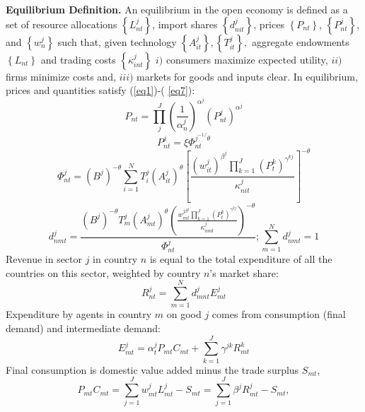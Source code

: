 \documentclass[12pt]{article}
\begin{document}
\textbf{Equilibrium Definition. } An equilibrium in the open economy is
defined as a set of resource allocations $\left\{ L_{nt}^{j}\right\} $,
import shares $\left\{ d_{nit}^{j}\right\} $, prices $\left\{ P_{nt}\right\} 
$, $\left\{ P_{nt}^{j}\right\} $, and $\left\{ w_{n}^{j}\right\} $ such
that, given technology $\left\{ A_{it}^{j}\right\} ,\left\{
T_{it}^{j}\right\} ,$ aggregate endowments $\left\{ L_{nt}\right\} $ and
trading costs $\left\{ \kappa _{int}^{j}\right\} $ $i)$ consumers maximize
expected utility, $ii)$ firms minimize costs and, $iii)$ markets for goods
and inputs clear. In equilibrium, prices and quantities satisfy (\ref{eq1})-(%
\ref{eq7}): 
\begin{equation}
P_{nt}=\prod_{j}^{J}\left( \frac{1}{\alpha _{n}^{j}}\right) ^{\alpha
^{j}}\left( P_{nt}^{j}\right) ^{\alpha ^{j}}  \label{eq1}
\end{equation}%
\begin{equation}
P_{nt}^{j}=\xi \Phi _{nt}^{j^{-1/}\theta }  \label{eq2}
\end{equation}%
\begin{equation}
\Phi _{nt}^{j}=\left( B^{j}\right) ^{-\theta }\sum_{i=1}^{N}T_{i}^{j}\left(
A_{it}^{j}\right) ^{\theta }\left[ \frac{\left( w_{it}^{j}\right) ^{\beta
^{j}}\prod_{k=1}^{J}(P_{t}^{k})^{\gamma ^{kj}}}{\kappa _{nit}^{j}}\right]
^{-\theta }  \label{eq3}
\end{equation}%
\begin{equation}
d_{nmt}^{j}=\frac{\left( B^{j}\right) ^{-\theta }T_{m}^{j}\left(
A_{mt}^{j}\right) ^{\theta }\left( \frac{w_{mt}^{j\beta
^{j}}\prod_{k=1}^{J}(P_{t}^{k})^{\gamma ^{kj}}}{\kappa _{nmt}^{j}}\right)
^{-\theta }}{\Phi _{nt}^{j}};\sum\limits_{m=1}^{N}d_{nmt}^{j}=1  \label{eq4}
\end{equation}%
Revenue in sector $j$ in country $n$ is equal to the total expenditure of
all the countries on this sector, weighted by country $n$'s market share: 
\begin{equation*}
R_{nt}^{j}=\sum_{m=1}^{N}d_{mnt}^{j}E_{mt}^{j}
\end{equation*}%
Expenditure by agents in country $m$ on good $j$ comes from consumption
(final demand) and intermediate demand: 
\begin{equation*}
E_{mt}^{j}=\alpha _{t}^{j}P_{mt}C_{mt}+\sum_{k=1}^{J}\gamma ^{jk}R_{mt}^{k}
\end{equation*}%
Final consumption is domestic value added minus the trade surplus $S_{mt}$, 
\begin{equation*}
P_{mt}C_{mt}=\sum_{j=1}^{J}w_{mt}^{j}L_{mt}^{j}-S_{mt}=\sum_{j=1}^{J}\beta
^{j}R_{mt}^{j}-S_{mt},
\end{equation*}%
\end{document}
